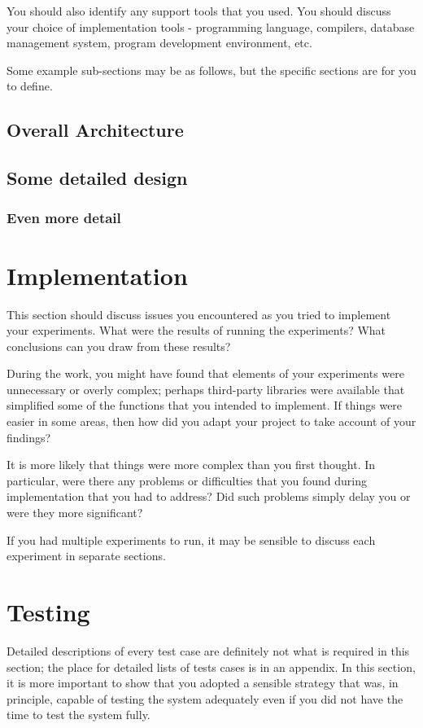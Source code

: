 You should also identify any support tools that you used. You should discuss your choice of implementation tools - programming language, compilers, database management system, program development environment, etc.

Some example sub-sections may be as follows, but the specific sections are for you to define. 

\subsection{Overall Architecture}

\subsection{Some detailed design}

\subsubsection{Even more detail}

\section{Implementation}

This section should discuss issues you encountered as you tried to implement your experiments. What were the results of running the experiments? What conclusions can you draw from these results? 

During the work, you might have found that elements of your experiments were unnecessary or overly complex; perhaps third-party libraries were available that simplified some of the functions that you intended to implement. If things were easier in some areas, then how did you adapt your project to take account of your findings?

It is more likely that things were more complex than you first thought. In particular, were there any problems or difficulties that you found during implementation that you had to address? Did such problems simply delay you or were they more significant? 

If you had multiple experiments to run, it may be sensible to discuss each experiment in separate sections. 

\section{Testing}
Detailed descriptions of every test case are definitely not what is required in this section; the place for detailed lists of tests cases is in an appendix. In this section, it is more important to show that you adopted a sensible strategy that was, in principle, capable of testing the system adequately even if you did not have the time to test the system fully. 

